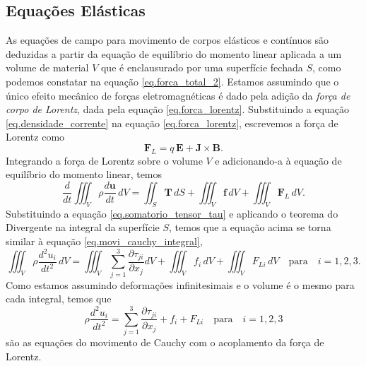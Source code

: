 \subsection{Equa\c{c}\~oes El\'asticas}

As equa\c{c}\~oes de campo para movimento de corpos el\' asticos e cont\'inuos s\~ao deduzidas a partir da equa\c{c}\~ao de equil\'ibrio do momento linear aplicada a um volume de material $V$ que \'e enclausurado por uma superf\'icie fechada $S$, como podemos constatar na equa\c{c}\~ao \ref{eq.forca_total_2}. Estamos assumindo que o \'unico efeito mec\^anico de for\c{c}as eletromagn\'eticas \'e dado pela adi\c{c}\~ao da \textit{for\c{c}a de corpo de Lorentz}, dada pela equa\c{c}\~ao \ref{eq.forca_lorentz}. Substituindo a equa\c{c}\~ao \ref{eq.densidade_corrente} na equa\c{c}\~ao \ref{eq.forca_lorentz}, escrevemos a for\c{c}a de Lorentz como
\begin{equation}
\textbf{F}_L=q\,\mathbf{E}+\textbf{J}\times\textbf{B}.
\end{equation}
Integrando a for\c{c}a de Lorentz sobre o volume $V$ e adicionando-a \`a equa\c{c}\~ao de equil\'ibrio do momento linear, temos
\begin{equation}
\frac{d}{dt}\iiint_V\rho\frac{d\mathbf{u}}{dt}\,dV=\iint_S\mathbf{T}\,dS+\iiint_V\mathbf{f}\,dV+\iiint_V\textbf{F}_L\,dV.
\end{equation}
Substituindo a equa\c{c}\~ao \ref{eq.somatorio_tensor_tau} e aplicando o teorema do Divergente na integral da superf\'icie $S$, temos que a equa\c{c}\~ao acima se torna similar \`a equa\c{c}\~ao \ref{eq.movi_cauchy_integral},
\begin{equation*}
\iiint_V\rho\frac{d^2u_i}{dt^2}\,dV=\iiint_V\sum_{j=1}^3\frac{\partial\tau_{ji}}{\partial x_j}dV+\iiint_Vf_i\,dV+\iiint_V F_{Li}\,dV\quad \text{para}\quad i=1,2,3.
\end{equation*}
Como estamos assumindo deforma\c{c}\~oes infinitesimais e o volume \'e o mesmo para cada integral, temos que
\begin{equation*}
\rho\frac{d^2u_i}{dt^2}=\sum_{j=1}^3\frac{\partial\tau_{ji}}{\partial x_j}+f_i+F_{Li}\quad \text{para}\quad i=1,2,3
\end{equation*}
s\~ao as equa\c{c}\~oes do movimento de Cauchy com o acoplamento da for\c{c}a de Lorentz.

